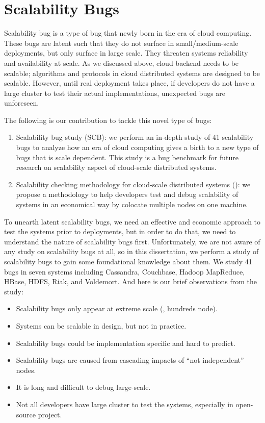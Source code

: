 \section{Scalability Bugs}

Scalability bug is a type of bug that newly born in the era of cloud
computing. These bugs are latent such that they do not surface in
small/medium-scale deployments, but only surface in large scale. They threaten
systems reliability and availability at scale. As we discussed above, cloud
backend needs to be scalable; algorithms and protocols in cloud distributed
systems are designed to be scalable. However, until real deployment takes place,
if developers do not have a large cluster to test their actual implementations,
unexpected bugs are unforeseen. 

The following is our contribution to tackle this novel type of bugs:

\begin{enumerate}

\item Scalability bug study (SCB): we perform an in-depth study of 41
scalability bugs to analyze how an era of cloud computing gives a birth to a new
type of bugs that is scale dependent. This study is a bug benchmark for future
research on scalability aspect of cloud-scale distributed systems.

\item Scalability checking methodology for cloud-scale distributed systems
(\sck): we propose a methodology to help developers test and debug scalability
of systems in an economical way by colocate multiple nodes on one machine.

\end{enumerate}
\fi

To unearth latent scalability bugs, we need an effective and economic approach
to test the systems prior to deployments, but in order to do that, we need to
understand the nature of scalability bugs first. Unfortunately, we are not aware
of any study on scalability bugs at all, so in this dissertation, we perform a
study of scalability bugs to gain some foundational knowledge about them. We
study 41 bugs in seven systems including Cassandra, Couchbase, Hadoop MapReduce,
HBase, HDFS, Riak, and Voldemort. And here is our brief observations from the
study:

\begin{itemize}
\item Scalability bugs only appear at extreme scale (\eg, hundreds node).
\item Systems can be scalable in design, but not in practice.
\item Scalability bugs could be implementation specific and hard to predict.
\item Scalability bugs are caused from cascading impacts of ``not independent'' nodes.
\item It is long and difficult to debug large-scale.
\item Not all developers have large cluster to test the systems, especially in
open-source project.
\end{itemize}

